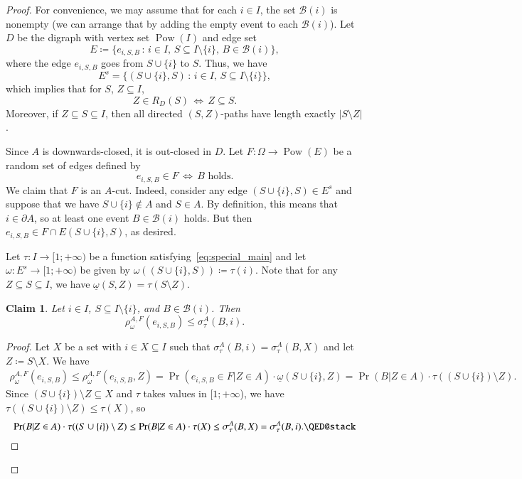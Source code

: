 \documentclass[10pt]{article}
\numberwithin{equation}{subsection}
\newtheorem{small_claim}{Claim}[theo]
\theoremstyle{definition}
\newcommand*{\myproofname}{Proof}
\newenvironment{claimproof}[1][\myproofname]{\begin{proof}[#1]\renewcommand*{\qedsymbol}{\(\dashv\)}}{\end{proof}}
\renewcommand{\qedsymbol}{$\blacksquare$}
\newcommand{\powerset}[1]{\operatorname{Pow}(#1)}
\begin{document}
	\begin{proof}
		For convenience, we may assume that for each $i \in I$, the set $\mathcal{B}(i)$ is nonempty (we can arrange that by adding the empty event to each $\mathcal{B}(i)$). Let $D$ be the digraph with vertex set $\powerset{I}$ and edge set $$E \coloneqq \{e_{i,S, B}\,:\, i \in I,\, S \subseteq I \setminus \{i\}, \, B \in \mathcal{B}(i)\},$$
		where the edge $e_{i, S, B}$ goes from $S \cup \{i\}$ to $S$. Thus, we have
		$$
			E^s = \{(S \cup \{i\}, S) \,:\, i \in I,\, S \subseteq I \setminus \{i\}\},
		$$
		which implies that for $S$, $Z \subseteq I$,
		$$
			Z \in R_D(S) \,\Longleftrightarrow\, Z \subseteq S.
		$$
		Moreover, if $Z \subseteq S \subseteq I$, then all directed $(S,Z)$-paths have length exactly $|S \setminus Z|$.
		
		Since $A$ is downwards-closed, it is out-closed in $D$. Let $F \colon \Omega \to \powerset{E}$ be a random set of edges defined by
		$$
			e_{i, S, B} \in F \,\Longleftrightarrow\, B \text{ holds}.
		$$
		We claim that $F$ is an $A$-cut. Indeed, consider any edge $(S \cup \{i\}, S) \in E^s$ and suppose that we have $S \cup \{i\} \not \in A$ and $S \in A$. By definition, this means that $i \in \partial A$, so at least one event $B \in \mathcal{B}(i)$ holds. But then $e_{i, S, B} \in F \cap E(S \cup \{i\}, S)$, as desired.
		
		Let $\tau \colon I \to [1; +\infty)$ be a function satisfying~\eqref{eq:special_main} and let $\omega \colon E^s \to [1; +\infty)$ be given by $\omega((S \cup \{i\}, S)) \coloneqq \tau(i)$. Note that for any $Z \subseteq S \subseteq I$, we have $\underline{\omega}(S, Z) = \tau(S \setminus Z)$.
		
		\begin{small_claim}\label{claim:ineq}
			Let $i \in I$, $S \subseteq I \setminus \{i\}$, and $B \in \mathcal{B}(i)$. Then
			$$
				\rho^{A, F}_{\omega}(e_{i, S, B}) \leq \sigma^A_\tau(B, i).
			$$
		\end{small_claim}
		\begin{claimproof}
			Let $X$ be a set with $i \in X \subseteq I$ such that $\sigma^A_\tau(B, i) = \sigma^A_\tau(B, X)$ and let $Z \coloneqq S \setminus X$. We have
			\begin{align*}
			\rho^{A, F}_\omega(e_{i, S, B}) \leq \rho^{A,F}_\omega(e_{i, S, B}, Z)
				=\Pr(e_{i, S, B} \in F \vert Z \in A) \cdot \underline{\omega}(S \cup \{i\}, Z)
			= \Pr(B \vert Z \in A) \cdot \tau((S \cup \{i\}) \setminus Z).
		\end{align*}
		Since $(S \cup \{i\}) \setminus Z \subseteq X$ and $\tau$ takes values in $[1; + \infty$), we have $\tau((S \cup \{i\}) \setminus Z) \leq \tau(X)$, so
		 $$
			\Pr(B \vert Z \in A) \cdot \tau((S \cup \{i\}) \setminus Z)\leq \Pr(B \vert Z \in A) \cdot \tau(X)
			\leq \sigma^A_\tau(B, X) = \sigma^A_\tau(B, i).\qedhere
		$$
		\end{claimproof}
		

\end{proof}
\end{document}
